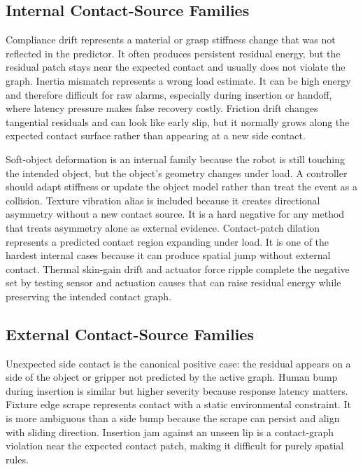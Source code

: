 \documentclass{article}
\begin{document}
\subsection{Internal Contact-Source Families}

Compliance drift represents a material or grasp stiffness change that was not reflected in the predictor. It often produces persistent residual energy, but the residual patch stays near the expected contact and usually does not violate the graph. Inertia mismatch represents a wrong load estimate. It can be high energy and therefore difficult for raw alarms, especially during insertion or handoff, where latency pressure makes false recovery costly. Friction drift changes tangential residuals and can look like early slip, but it normally grows along the expected contact surface rather than appearing at a new side contact.

Soft-object deformation is an internal family because the robot is still touching the intended object, but the object's geometry changes under load. A controller should adapt stiffness or update the object model rather than treat the event as a collision. Texture vibration alias is included because it creates directional asymmetry without a new contact source. It is a hard negative for any method that treats asymmetry alone as external evidence. Contact-patch dilation represents a predicted contact region expanding under load. It is one of the hardest internal cases because it can produce spatial jump without external contact. Thermal skin-gain drift and actuator force ripple complete the negative set by testing sensor and actuation causes that can raise residual energy while preserving the intended contact graph.

\subsection{External Contact-Source Families}

Unexpected side contact is the canonical positive case: the residual appears on a side of the object or gripper not predicted by the active graph. Human bump during insertion is similar but higher severity because response latency matters. Fixture edge scrape represents contact with a static environmental constraint. It is more ambiguous than a side bump because the scrape can persist and align with sliding direction. Insertion jam against an unseen lip is a contact-graph violation near the expected contact patch, making it difficult for purely spatial rules.
\end{document}
